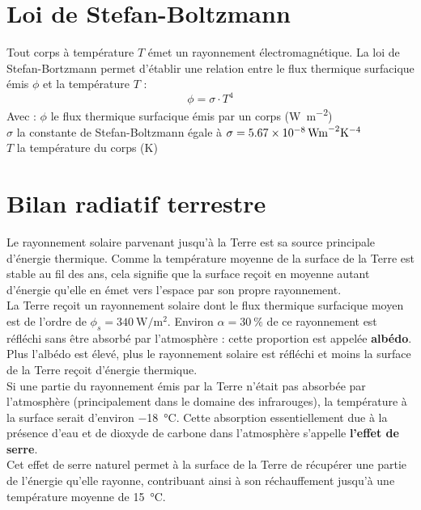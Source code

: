 \documentclass[a4paper,11pt,fleqn]{article}%
\begin{document}
	\maketitle
\section{Loi de Stefan-Boltzmann}
Tout corps à température $T$ émet un rayonnement électromagnétique. La loi de Stefan-Bortzmann permet d'établir une relation entre le flux thermique surfacique émis $\phi$ et la température $T$ :
$$\phi = \sigma \cdot T^4$$
Avec : $\phi$ le flux thermique surfacique émis par un corps (\unit{\watt\per\meter\squared})\\
$\sigma$ la constante de Stefan-Boltzmann égale à $\sigma = \SI{5,67E-8}{W m^{-2} K^{-4}}$\\
$T$ la température du corps (\unit{\kelvin})

\section{Bilan radiatif terrestre}
Le rayonnement solaire parvenant jusqu'à la Terre est sa source principale d'énergie thermique. Comme la température moyenne de la surface de la Terre est stable au fil des ans, cela signifie que la surface reçoit en moyenne autant d'énergie qu'elle en émet vers l'espace par son propre rayonnement.\\
La Terre reçoit un rayonnement solaire dont le flux thermique surfacique moyen est de l'ordre de $\phi_s =\SI{340}{\watt\per\meter\squared}$. Environ $\alpha = \SI{30}{\percent}$ de ce rayonnement est réfléchi sans être absorbé par l'atmosphère : cette proportion est appelée \textbf{albédo}.\\
Plus l'albédo est élevé, plus le rayonnement solaire est réfléchi et moins la surface de la Terre reçoit d'énergie thermique.\\
Si une partie du rayonnement émis par la Terre n'était pas absorbée par l'atmosphère (principalement dans le domaine des infrarouges), la température à la surface serait d'environ \SI{-18}{\celsius}. Cette absorption essentiellement due à la présence d'eau  et de dioxyde de carbone  dans l'atmosphère s'appelle \textbf{l'effet de serre}.\\
Cet effet de serre naturel permet à la surface de la Terre de récupérer une partie de l'énergie qu'elle rayonne, contribuant ainsi à son réchauffement jusqu'à une température moyenne de \SI{15}{\celsius}.
\end{document}
